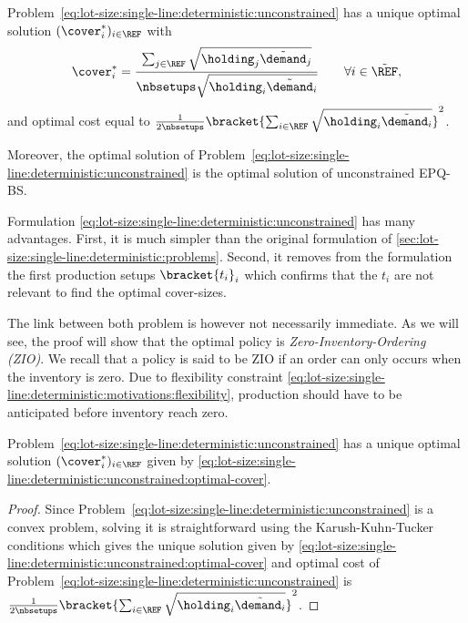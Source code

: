 \begin{thm}\label{thm:lot-size:single-line:deterministic:unconstrained:optimality}
Problem~\eqref{eq:lot-size:single-line:deterministic:unconstrained} has a unique optimal solution $(\cover_i^*)_{i\in\REF}$ with
\begin{equation}\label{eq:lot-size:single-line:deterministic:unconstrained:optimal-cover}
  \cover_i^*= \frac{\sum_{j\in\REF}\sqrt{\holding_j\tilde{\demand}_j}}{\nbsetups\sqrt{\holding_i\tilde{\demand}_i}}\qquad\forall i\in\tilde{\REF},
\end{equation}
and optimal cost equal to $\frac{1}{2\nbsetups}\bracket{\sum_{i\in\REF}\sqrt{\holding_i\tilde{\demand_i}}}^2$.

Moreover, the optimal solution of Problem~\eqref{eq:lot-size:single-line:deterministic:unconstrained} is the optimal solution of unconstrained EPQ-BS.
\end{thm}


Formulation \eqref{eq:lot-size:single-line:deterministic:unconstrained} has many advantages.
First, it is much simpler than the original formulation of \cref{sec:lot-size:single-line:deterministic:problems}.
Second, it removes from the formulation the first production setups $\bracket{t_i}_i$ which confirms that the $t_i$ are not relevant to find the optimal cover-sizes.


The link between both problem is however not necessarily immediate.
As we will see, the proof will show that the optimal policy is \emph{Zero-Inventory-Ordering (ZIO)}.
We recall that a policy is said to be ZIO if an order can only occurs when the inventory is zero.
Due to flexibility constraint \eqref{eq:lot-size:single-line:deterministic:motivations:flexibility}, production should have to be anticipated before inventory reach zero.



\begin{lem}\label{lem:lot-size:single-line:deterministic:unconstrained:optimality}
Problem~\eqref{eq:lot-size:single-line:deterministic:unconstrained} has a unique optimal solution $(\cover_i^*)_{i\in\REF}$ given by \cref{eq:lot-size:single-line:deterministic:unconstrained:optimal-cover}.
\end{lem}


\begin{proof}
Since Problem~\eqref{eq:lot-size:single-line:deterministic:unconstrained} is a convex problem, solving it is straightforward using the Karush-Kuhn-Tucker conditions which gives the unique solution given by \cref{eq:lot-size:single-line:deterministic:unconstrained:optimal-cover} and optimal cost of Problem~\eqref{eq:lot-size:single-line:deterministic:unconstrained} is $\frac{1}{2\nbsetups}\bracket{\sum_{i\in\REF}\sqrt{\holding_i\tilde{\demand_i}}}^2$.
\end{proof}



